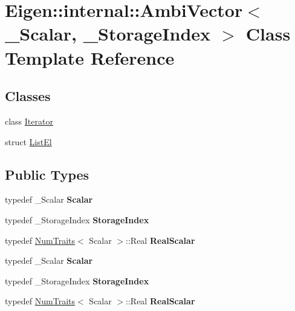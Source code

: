 \hypertarget{class_eigen_1_1internal_1_1_ambi_vector}{}\section{Eigen\+:\+:internal\+:\+:Ambi\+Vector$<$ \+\_\+\+Scalar, \+\_\+\+Storage\+Index $>$ Class Template Reference}
\label{class_eigen_1_1internal_1_1_ambi_vector}
\subsection*{Classes}
\begin{DoxyCompactItemize}
\item 
class \hyperlink{class_eigen_1_1internal_1_1_ambi_vector_1_1_iterator}{Iterator}
\item 
struct \hyperlink{struct_eigen_1_1internal_1_1_ambi_vector_1_1_list_el}{List\+El}
\end{DoxyCompactItemize}
\subsection*{Public Types}
\begin{DoxyCompactItemize}
\item 
\mbox{\label{class_eigen_1_1internal_1_1_ambi_vector_a6111a2001a21ebc2f5b241d8ea68c25e}} 
typedef \+\_\+\+Scalar {\bfseries Scalar}
\item 
\mbox{\label{class_eigen_1_1internal_1_1_ambi_vector_a7cfebaeb966f905edf535b546694c70f}} 
typedef \+\_\+\+Storage\+Index {\bfseries Storage\+Index}
\item 
\mbox{\label{class_eigen_1_1internal_1_1_ambi_vector_a72bf2db15936c5be139b9ffc90dc6bff}} 
typedef \hyperlink{group___core___module_struct_eigen_1_1_num_traits}{Num\+Traits}$<$ Scalar $>$\+::Real {\bfseries Real\+Scalar}
\item 
\mbox{\label{class_eigen_1_1internal_1_1_ambi_vector_a6111a2001a21ebc2f5b241d8ea68c25e}} 
typedef \+\_\+\+Scalar {\bfseries Scalar}
\item 
\mbox{\label{class_eigen_1_1internal_1_1_ambi_vector_a7cfebaeb966f905edf535b546694c70f}} 
typedef \+\_\+\+Storage\+Index {\bfseries Storage\+Index}
\item 
\mbox{\label{class_eigen_1_1internal_1_1_ambi_vector_a72bf2db15936c5be139b9ffc90dc6bff}} 
typedef \hyperlink{group___core___module_struct_eigen_1_1_num_traits}{Num\+Traits}$<$ Scalar $>$\+::Real {\bfseries Real\+Scalar}
\end{DoxyCompactItemize}
